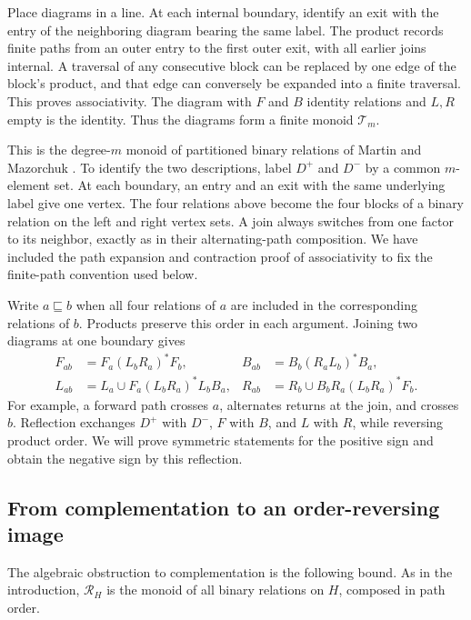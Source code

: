 Place diagrams in a line. At each internal boundary, identify an exit
with the entry of the neighboring diagram bearing the same label.
The product records finite paths from an outer entry to the first outer
exit, with all earlier joins internal. A traversal of any consecutive
block can be replaced by one edge of the block's product, and that edge
can conversely be expanded into a finite traversal. This proves
associativity. The diagram with $F$ and $B$ identity relations and $L,R$
empty is the identity. Thus the diagrams form a finite monoid
$\mathcal T_m$.

This is the degree-$m$ monoid of partitioned binary relations of
Martin and Mazorchuk \cite[Sections~2.1--2.3]{MartinMazorchuk2013}.
To identify the two descriptions, label $D^+$ and $D^-$ by a common
$m$-element set. At each boundary, an entry and an exit with the same
underlying label give one vertex. The four relations above become
the four blocks of a binary relation on the left and right vertex
sets. A join always switches from one factor to its neighbor, exactly
as in their alternating-path composition. We have included the
path expansion and contraction proof of associativity to fix the
finite-path convention used below.

Write $a\sqsubseteq b$ when all four relations of $a$ are included in
the corresponding relations of $b$. Products preserve this order in
each argument. Joining two diagrams at one boundary gives
\begin{equation}\label{diag:product}
\begin{aligned}
 F_{ab}&=F_a(L_bR_a)^*F_b,&
 B_{ab}&=B_b(R_aL_b)^*B_a,\\
 L_{ab}&=L_a\cup F_a(L_bR_a)^*L_bB_a,&
 R_{ab}&=R_b\cup B_bR_a(L_bR_a)^*F_b.
\end{aligned}
\end{equation}
For example, a forward path crosses $a$, alternates returns at the join,
and crosses $b$. Reflection exchanges $D^+$ with $D^-$, $F$ with $B$,
and $L$ with $R$, while reversing product order. We will prove symmetric
statements for the positive sign and obtain the negative sign by this
reflection.

\subsection{From complementation to an order-reversing image}

The algebraic obstruction to complementation is the following bound.
As in the introduction, $\mathcal R_H$ is the monoid of all binary
relations on $H$, composed in path order.

